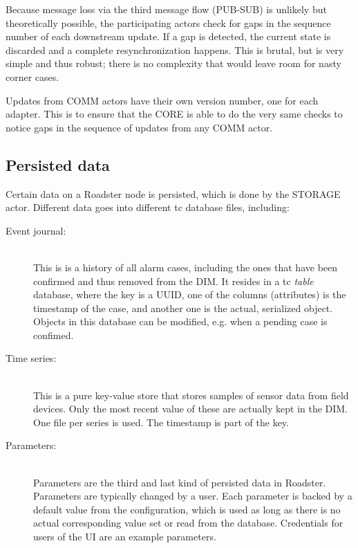 Because message loss via the third message flow (PUB-SUB) is unlikely but
theoretically possible, the participating actors check for gaps in the sequence number of
each downstream update. If a gap is detected, the current state is discarded and a
complete resynchronization happens. This is brutal, but is very simple and thus
robust; there is no complexity that would leave room for nasty corner cases.

Updates from COMM actors have their own version number, one for each adapter.
This is to ensure that the CORE is able to do the very same checks to notice
gaps in the sequence of updates from any COMM actor.



\subsection{Persisted data}\label{sec:scope:persisted_data}
Certain data on a Roadster node is persisted, which is done by the STORAGE
actor. Different data goes into different \gls{tc} database files, including:

\begin{description}
	\item [ Event journal: ] \hfill\\
		This is is a history of all alarm cases, including the ones
		that have been confirmed and thus removed from the DIM. It
		resides in a \gls{tc} \emph{table} database, where the key is a
		\gls{UUID}, one of the columns (attributes) is the timestamp of
		the case, and another one is the actual, serialized 
		object. Objects in this database can be modified, e.g. when a
		pending case is confimed.

	\item [ Time series: ] \hfill\\
		This is a pure key-value store that stores samples of sensor
		data from field devices. Only the most recent value of these
		are actually kept in the DIM. One file per series is used. The
		timestamp is part of the key.

	\item [ Parameters: ] \hfill\\
		Parameters are the third and last kind of persisted data in
		Roadster. Parameters are typically changed by a user. Each
		parameter is backed by a default value from the configuration,
		which is used as long as there is no actual corresponding value
		set or read from the database. Credentials for users of the UI
		are an example parameters.
\end{description}




